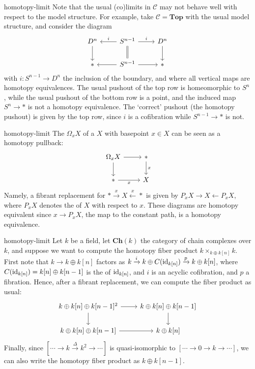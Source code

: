 \begin{example}{homotopy-limit}
    Note that the usual (co)limits in $\mathcal{C}$ may not behave well with respect to the model structure. For example, take $\mathcal{C} = \textbf{Top}$ with the usual model structure, and consider the diagram
    \[ \svg \begin{tikzcd} D^n \arrow{d} & S^{n - 1} \arrow[swap]{l}{i} \arrow{r}{i} \arrow[equals]{d} & D^n \arrow{d} \\ * & S^{n - 1} \arrow{l} \arrow{r} & * \end{tikzcd} \]
    with $i \colon S^{n - 1} \to D^n$ the inclusion of the boundary, and where all vertical maps are homotopy equivalences. The usual pushout of the top row is homeomorphic to $S^n$, while the usual pushout of the bottom row is a point, and the induced map $S^n \to *$ is not a homotopy equivalence. The `correct' pushout (the homotopy pushout) is given by the top row, since $i$ is a cofibration while $S^{n - 1} \to *$ is not.
\end{example}

\begin{example}{homotopy-limit}
    The  $\Omega_x X$ of a  $X$ with basepoint $x \in X$ can be seen as a homotopy pullback:
    \[ \svg \begin{tikzcd} \Omega_x X \arrow{d} \arrow{r} & * \arrow{d}{x} \\ * \arrow[swap]{r}{x} & X \end{tikzcd} \]
    Namely, a fibrant replacement for $* \xrightarrow{x} X \xleftarrow{x} *$ is given by $P_x X \rightarrow X \leftarrow P_x X$, where $P_x X$ denotes the  of $X$ with respect to $x$. These diagrams are homotopy equivalent since $x \to P_x X$, the map to the constant path, is a homotopy equivalence.
\end{example}

\begin{example}{homotopy-limit}
    Let $k$ be a field, let $\textbf{Ch}(k)$ the category of chain complexes over $k$, and suppose we want to compute the homotopy fiber product $k \times_{k \oplus k[n]} k$. First note that $k \to k \oplus k[n]$ factors as $k \xrightarrow{i} k \oplus C(\textup{id}_{k[n]}) \xrightarrow{p} k \oplus k[n]$, where $C(\textup{id}_{k[n]}) = k[n] \oplus k[n - 1]$ is the  of $\textup{id}_{k[n]}$, and $i$ is an acyclic cofibration, and $p$ a fibration. Hence, after a fibrant replacement, we can compute the fiber product as usual:
    \[ \svg \begin{tikzcd} k \oplus k[n] \oplus k[n - 1]^2 \arrow{d} \arrow{r} & k \oplus k[n] \oplus k[n - 1] \arrow{d} \\ k \oplus k[n] \oplus k[n - 1] \arrow{r} & k \oplus k[n] \end{tikzcd} \]
    Finally, since $[ \cdots \to k \xrightarrow{\Delta} k^2 \to \cdots ]$ is quasi-isomorphic to $[ \cdots \to 0 \to k \to \cdots ]$, we can also write the homotopy fiber product as $k \oplus k[n - 1]$.
\end{example}

